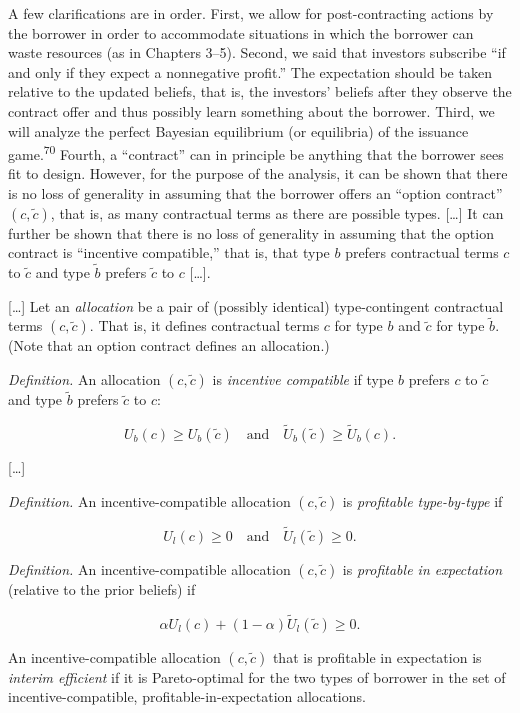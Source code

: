 \documentclass[11pt,a4paper]{article}
\begin{document}
A few clarifications are in order. First, we allow for post-contracting actions by the borrower in
order to accommodate situations in which the borrower can waste resources (as in Chapters 3--5).
Second, we said that investors subscribe ``if and only if they expect a nonnegative profit.'' The
expectation should be taken relative to the updated beliefs, that is, the investors' beliefs after
they observe the contract offer and thus possibly learn something about the borrower. Third, we will
analyze the perfect Bayesian equilibrium (or equilibria) of the issuance game.\textsuperscript{70}
Fourth, a ``contract'' can in principle be anything that the borrower sees fit to design. However,
for the purpose of the analysis, it can be shown that there is no loss of generality in assuming
that the borrower offers an ``option contract'' \((c, \tilde{c})\), that is, as many contractual
terms as there are possible types. {[}\ldots{]} It can further be shown that there is no loss of
generality in assuming that the option contract is ``incentive compatible,'' that is, that type
\(b\) prefers contractual terms \(c\) to \(\tilde{c}\) and type \(\tilde{b}\) prefers \(\tilde{c}\)
to \(c\) {[}\ldots{]}.

{[}\ldots{]} Let an \emph{allocation} be a pair of (possibly identical) type-contingent contractual
terms \((c, \tilde{c})\). That is, it defines contractual terms \(c\) for type \(b\) and
\(\tilde{c}\) for type \(\tilde{b}\). (Note that an option contract defines an allocation.)

\emph{Definition.} An allocation \((c, \tilde{c})\) is \emph{incentive compatible} if type \(b\)
prefers \(c\) to \(\tilde{c}\) and type \(\tilde{b}\) prefers \(\tilde{c}\) to \(c\):

\[U_b(c) \geqslant U_b(\tilde{c}) \quad \text{and} \quad \tilde{U}_b(\tilde{c}) \geqslant \tilde{U}_b(c).\]

{[}\ldots{]}

\emph{Definition.} An incentive-compatible allocation \((c, \tilde{c})\) is \emph{profitable
type-by-type} if

\[U_l(c) \geqslant 0 \quad \text{and} \quad \tilde{U}_l(\tilde{c}) \geqslant 0.\]

\emph{Definition.} An incentive-compatible allocation \((c, \tilde{c})\) is \emph{profitable in
expectation} (relative to the prior beliefs) if

\[\alpha U_l(c) + (1 - \alpha)\tilde{U}_l(\tilde{c}) \geqslant 0.\]

An incentive-compatible allocation \((c, \tilde{c})\) that is profitable in expectation is
\emph{interim efficient} if it is Pareto-optimal for the two types of borrower in the set of
incentive-compatible, profitable-in-expectation allocations.
\end{document}
